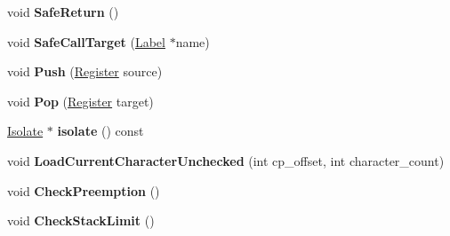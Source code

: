 \begin{DoxyCompactItemize}
\item 
void {\bfseries Safe\+Return} ()\hypertarget{classv8_1_1internal_1_1_reg_exp_macro_assembler_m_i_p_s_a1e59cb61230601895d4465a0227168be}{}\label{classv8_1_1internal_1_1_reg_exp_macro_assembler_m_i_p_s_a1e59cb61230601895d4465a0227168be}

\item 
void {\bfseries Safe\+Call\+Target} (\hyperlink{classv8_1_1internal_1_1_label}{Label} $\ast$name)\hypertarget{classv8_1_1internal_1_1_reg_exp_macro_assembler_m_i_p_s_aaa0695e965306ca0eec9aff29fbbac13}{}\label{classv8_1_1internal_1_1_reg_exp_macro_assembler_m_i_p_s_aaa0695e965306ca0eec9aff29fbbac13}

\item 
void {\bfseries Push} (\hyperlink{structv8_1_1internal_1_1_register}{Register} source)\hypertarget{classv8_1_1internal_1_1_reg_exp_macro_assembler_m_i_p_s_ae8b3687ba22d8555ac4c8650ba92490e}{}\label{classv8_1_1internal_1_1_reg_exp_macro_assembler_m_i_p_s_ae8b3687ba22d8555ac4c8650ba92490e}

\item 
void {\bfseries Pop} (\hyperlink{structv8_1_1internal_1_1_register}{Register} target)\hypertarget{classv8_1_1internal_1_1_reg_exp_macro_assembler_m_i_p_s_a0363fa6cd2398ef4546317d0c0b36d29}{}\label{classv8_1_1internal_1_1_reg_exp_macro_assembler_m_i_p_s_a0363fa6cd2398ef4546317d0c0b36d29}

\item 
\hyperlink{classv8_1_1internal_1_1_isolate}{Isolate} $\ast$ {\bfseries isolate} () const \hypertarget{classv8_1_1internal_1_1_reg_exp_macro_assembler_m_i_p_s_adc2e2b34efc0066fa49fcd035938460b}{}\label{classv8_1_1internal_1_1_reg_exp_macro_assembler_m_i_p_s_adc2e2b34efc0066fa49fcd035938460b}

\item 
void {\bfseries Load\+Current\+Character\+Unchecked} (int cp\+\_\+offset, int character\+\_\+count)\hypertarget{classv8_1_1internal_1_1_reg_exp_macro_assembler_m_i_p_s_a4ccb836e4dea25531f3980c89bee5339}{}\label{classv8_1_1internal_1_1_reg_exp_macro_assembler_m_i_p_s_a4ccb836e4dea25531f3980c89bee5339}

\item 
void {\bfseries Check\+Preemption} ()\hypertarget{classv8_1_1internal_1_1_reg_exp_macro_assembler_m_i_p_s_a4143bbca236efc9d173fbaaa80cb6319}{}\label{classv8_1_1internal_1_1_reg_exp_macro_assembler_m_i_p_s_a4143bbca236efc9d173fbaaa80cb6319}

\item 
void {\bfseries Check\+Stack\+Limit} ()\hypertarget{classv8_1_1internal_1_1_reg_exp_macro_assembler_m_i_p_s_ac43a8d386f07985cf14ff3ed8b8e03d1}{}\label{classv8_1_1internal_1_1_reg_exp_macro_assembler_m_i_p_s_ac43a8d386f07985cf14ff3ed8b8e03d1}


\end{DoxyCompactItemize}
